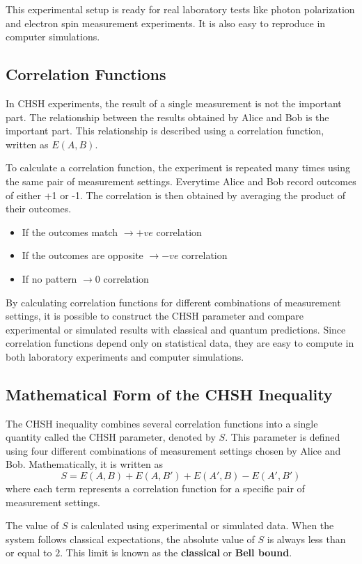 \documentclass[17pt,a4paper]{extarticle}
\begin{document}
This experimental setup is ready for real laboratory tests like photon polarization and electron spin measurement experiments. It is also easy to reproduce in computer simulations.

\subsection{Correlation Functions}
In CHSH experiments, the result of a single measurement is not the important part. The relationship between the results obtained by Alice and Bob is the important part. This relationship is described using a correlation function, written as $E(A,B)$.

To calculate a correlation function, the experiment is repeated many times using the same pair of measurement settings. Everytime Alice and Bob record outcomes of either +1 or -1. The correlation is then obtained by averaging the product of their outcomes.
\begin{itemize}
    \item If the outcomes match $\rightarrow +ve$ correlation
    \item If the outcomes are opposite $\rightarrow -ve$ correlation
    \item If no pattern $\rightarrow 0$ correlation
\end{itemize}
By calculating correlation functions for different combinations of measurement settings, it is possible to construct the CHSH parameter and compare experimental or simulated results with classical and quantum predictions. Since correlation functions depend only on statistical data, they are easy to compute in both laboratory experiments and computer simulations.

\subsection{Mathematical Form of the CHSH Inequality}
The CHSH inequality combines several correlation functions into a single quantity called the CHSH parameter, denoted by $S$. This parameter is defined using four different combinations of measurement settings chosen by Alice and Bob. Mathematically, it is written as
\begin{equation*}
S=E(A,B)+E(A,B')+E(A',B)-E(A',B')
\end{equation*}
where each term represents a correlation function for a specific pair of measurement settings.

The value of $S$ is calculated using experimental or simulated data. When the system follows classical expectations, the absolute value of $S$ is always less than or equal to $2$. This limit is known as the \textbf{classical} or \textbf{Bell bound}.
\end{document}
